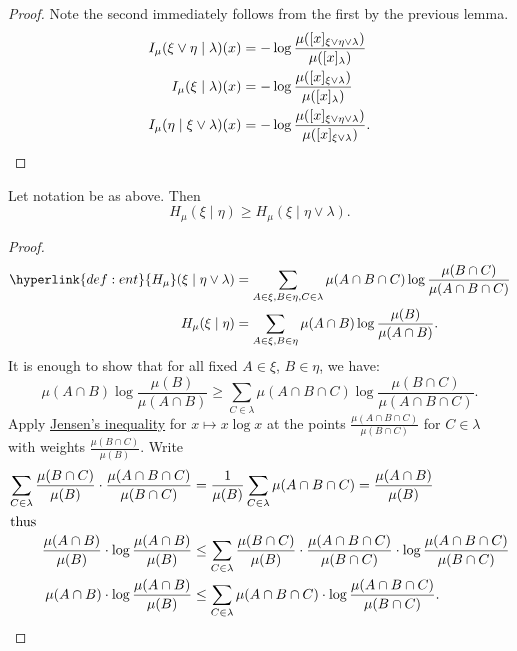 \documentclass{article}
\begin{document}
\begin{proof}
  Note the second immediately follows from the first by the previous lemma.
  \begin{align*}
    I_\mu(\xi \vee \eta \mid \lambda)(x) &= -\log \frac{\mu([x]_{\xi \vee \eta \vee \lambda})}{\mu([x]_{\lambda})} \\
    I_\mu(\xi \mid \lambda)(x) &= -\log \frac{\mu([x]_{\xi \vee \lambda})}{\mu([x]_{\lambda})} \\
    I_\mu(\eta \mid \xi \vee \lambda)(x) &= -\log \frac{\mu([x]_{\xi \vee \eta \vee \lambda})}{\mu([x]_{\xi \vee \lambda})}. \qedhere
  \end{align*}
\end{proof}
\begin{lemma}
  Let notation be as above. Then
  \begin{equation*}
    H_\mu(\xi \mid \eta) \geq H_\mu(\xi \mid \eta \vee \lambda).
  \end{equation*}
\end{lemma}
\begin{proof}
  \begin{align*}
    \hyperlink{def:ent}{H_\mu}(\xi \mid \eta \vee \lambda) &= \sum_{A \in\xi, B \in \eta, C \in \lambda} \mu(A \cap B \cap C) \log\frac{\mu(B \cap C)}{\mu(A \cap B \cap C)} \\
    H_\mu(\xi \mid \eta) &= \sum_{A \in\xi, B \in \eta} \mu(A \cap B) \log\frac{\mu(B)}{\mu(A \cap B)}.
  \end{align*}
  It is enough to show that for all fixed $A \in \xi$, $B \in \eta$, we have:
  \begin{equation*}
    \mu(A \cap B) \log \frac{\mu(B)}{\mu(A \cap B)} \geq \sum_{C \in \lambda} \mu(A \cap B \cap C) \log \frac{\mu(B \cap C)}{\mu(A \cap B \cap C)}.
  \end{equation*}
  Apply \hyperlink{lem:jensen}{Jensen's inequality} for $x \mapsto x \log x$ at the points $\frac{\mu(A \cap B \cap C)}{\mu(B \cap C)}$ for $C \in \lambda$ with weights $\frac{\mu(B\cap C)}{\mu(B)}$.
  Write
  \begin{align*}
    \sum_{C \in \lambda} \frac{\mu(B\cap C)}{\mu(B)} \cdot \frac{\mu(A \cap B \cap C)}{\mu(B \cap C)} &= \frac{1}{\mu(B)} \sum_{C \in \lambda} \mu(A \cap B \cap C) = \frac{\mu(A \cap B)}{\mu(B)} \\
    \shortintertext{thus}
    \frac{\mu(A \cap B)}{\mu(B)} \cdot \log \frac{\mu(A \cap B)}{\mu(B)} &\leq \sum_{C \in \lambda} \frac{\mu(B \cap C)}{\mu(B)} \cdot \frac{\mu(A \cap B \cap C)}{\mu(B \cap C)} \cdot \log \frac{\mu(A \cap B \cap C)}{\mu(B \cap C)} \\
    \mu(A \cap B) \cdot \log \frac{\mu(A \cap B)}{\mu(B)} &\leq \sum_{C \in \lambda} \mu(A \cap B \cap C) \cdot \log \frac{\mu(A \cap B \cap C)}{\mu(B \cap C)}. \qedhere
  \end{align*}
\end{proof}
\end{document}
